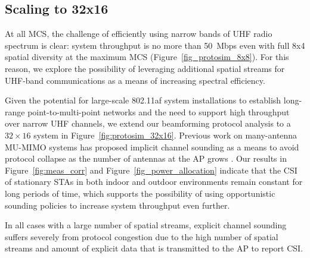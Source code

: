 \subsection{Scaling to 32x16}
\label{sec:scaling}

	At all \ac{MCS}, the challenge of efficiently using narrow bands of UHF radio spectrum is clear: system throughput is no more than 50~Mbps even with full 8x4 spatial diversity at the maximum \ac{MCS} (Figure~\ref{fig_protosim_8x8}).
	For this reason, we explore the possibility of leveraging additional spatial streams for UHF-band communications as a means of increasing spectral efficiency.

 Given the potential for large-scale 802.11af system installations to establish long-range point-to-multi-point networks and the need to support high throughput over narrow UHF channels, we extend our beamforming protocol analysis to a $32\times16$ system in Figure~\ref{fig:protosim_32x16}.
 Previous work on many-antenna \ac{MU-MIMO} systems has proposed implicit channel sounding as a means to avoid protocol collapse as the number of antennas at the \ac{AP} grows \cite{shepard2012argos}.
 Our results in Figure~\ref{fig:meas_corr} and Figure~\ref{fig_power_allocation} indicate that the \ac{CSI} of stationary \acp{STA} in both indoor and outdoor environments remain constant for long periods of time, which supports the possibility of using opportunistic sounding policies to increase system throughput even further.

	In all cases with a large number of spatial streams, explicit channel sounding suffers severely from protocol congestion due to the high number of spatial streams and amount of explicit data that is transmitted to the \ac{AP} to report \ac{CSI}.
	
